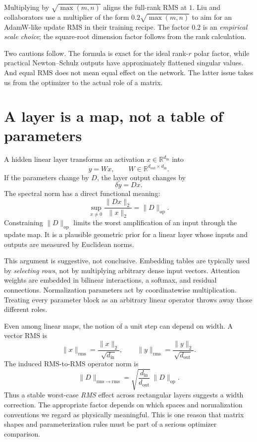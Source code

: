 Multiplying by \(\sqrt{\max(m,n)}\) aligns the full-rank RMS at \(1\).  Liu and collaborators use a multiplier of the form \(0.2\sqrt{\max(m,n)}\) to aim for an AdamW-like update RMS in their training recipe.  The factor \(0.2\) is an \emph{empirical scale choice}; the square-root dimension factor follows from the rank calculation.

Two cautions follow.  The formula is exact for the ideal rank-\(r\) polar factor, while practical Newton--Schulz outputs have approximately flattened singular values.  And equal RMS does not mean equal effect on the network.  The latter issue takes us from the optimizer to the actual role of a matrix.

\section{A layer is a map, not a table of parameters}

A hidden linear layer transforms an activation \(x\in\mathbb R^{d_{\mathrm{in}}}\) into
\[
 y=Wx,\qquad W\in\mathbb R^{d_{\mathrm{out}}\times d_{\mathrm{in}}}.
\]
If the parameters change by \(D\), the layer output changes by
\[
 \delta y=Dx.
\]
The spectral norm has a direct functional meaning:
\begin{equation}
 \sup_{x\ne0}\frac{\|Dx\|_2}{\|x\|_2}=\|D\|_{\mathrm{op}}.
 \label{eq:N20261017-operator-gain}
\end{equation}
Constraining \(\|D\|_{\mathrm{op}}\) limits the worst amplification of an input through the update map.  It is a plausible geometric prior for a linear layer whose inputs and outputs are measured by Euclidean norms.

This argument is suggestive, not conclusive.  Embedding tables are typically used by \emph{selecting rows}, not by multiplying arbitrary dense input vectors.  Attention weights are embedded in bilinear interactions, a softmax, and residual connections.  Normalization parameters act by coordinatewise multiplication.  Treating every parameter block as an arbitrary linear operator throws away those different roles.

Even among linear maps, the notion of a unit step can depend on width.  A vector RMS is
\[
 \|x\|_{\mathrm{rms}}=\frac{\|x\|_2}{\sqrt{d_{\mathrm{in}}}},
 \qquad
 \|y\|_{\mathrm{rms}}=\frac{\|y\|_2}{\sqrt{d_{\mathrm{out}}}}.
\]
The induced RMS-to-RMS operator norm is
\begin{equation}
 \|D\|_{\mathrm{rms}\to\mathrm{rms}}
 =\sqrt{\frac{d_{\mathrm{in}}}{d_{\mathrm{out}}}}\,
       \|D\|_{\mathrm{op}}.
 \label{eq:N20261017-rms-operator}
\end{equation}
Thus a stable worst-case \emph{RMS} effect across rectangular layers suggests a width correction.  The appropriate factor depends on which spaces and normalization conventions we regard as physically meaningful.  This is one reason that matrix shapes and parameterization rules must be part of a serious optimizer comparison.


